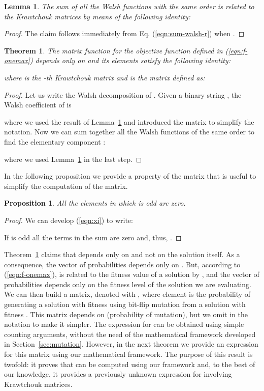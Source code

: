 \documentclass{article}
\newtheorem{theorem}{Theorem}
\newtheorem{lemma}{Lemma}
\newtheorem{proposition}{Proposition}
\begin{document}
\begin{lemma}
\label{lem:sum-walsh}
The sum of all the Walsh functions with the same order is related to the Krawtchouk matrices by means of the following identity:

\end{lemma}
\begin{proof}
The claim follows immediately from Eq. (\ref{eqn:sum-walsh-r}) when .\end{proof}

\begin{theorem}
\label{thm:fmatrix-onemax}
The matrix function  for the objective function  defined in (\ref{eqn:f-onemax}) depends only on  and its elements satisfy the following identity:

where  is the -th Krawtchouk matrix and  is the matrix defined as:

\end{theorem}

\begin{proof}
Let us write the Walsh decomposition of . Given a binary string , the Walsh coefficient  of  is

where we used the result of Lemma~\ref{lem:sum-walsh} and introduced the matrix  to simplify the notation. Now we can sum together all the Walsh functions of the same order  to find the elementary component :

where we used Lemma~\ref{lem:sum-walsh} in the last step.
\end{proof}

In the following proposition we provide a property of the  matrix that is useful to simplify the computation of the matrix.

\begin{proposition}
All the elements  in which  is odd are zero. 
\end{proposition}
\begin{proof}
We can develop (\ref{eqn:xi}) to write:

If  is odd all the terms in the sum are zero and, thus, .
\end{proof}

Theorem~\ref{thm:fmatrix-onemax} claims that  depends only on  and not on the solution itself. As a consequence, the vector of probabilities  depends only on . But, according to (\ref{eqn:f-onemax}),  is related to the fitness value of a solution by , and the vector of probabilities  depends only on the fitness level of the solution we are evaluating. We can then build a matrix, denoted with , where element  is the probability of generating a solution with fitness  using bit-flip mutation from a solution with fitness . This matrix depends on  (probability of mutation), but we omit  in the notation to make it simpler. The expression for  can be obtained using simple counting arguments, without the need of the mathematical framework developed in Section~\ref{sec:mutation}. However, in the next theorem we provide an expression for this matrix using our mathematical framework. The purpose of this result is twofold: it proves that   can be computed using our framework and, to the best of our knowledge, it provides a
previously unknown expression for  involving Krawtchouk matrices. 
\end{document}

